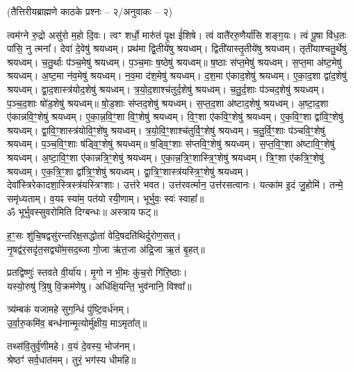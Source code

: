 \centerline{\scriptsize (तैत्तिरीयब्राह्मणे काठके प्रश्नः – २/अनुवाकः – २)}
त्वम॑ग्ने रु॒द्रो असु॑रो म॒हो दि॒वः। त्वꣳ शर्धो॒ मारु॑तं पृ॒क्ष ई॑शिषे।
त्वं वातै॑ररु॒णैर्या॑सि शङ्ग॒यः। त्वं पू॒षा वि॑ध॒तः पा॑सि॒ नु त्मना᳚।
देवा॑ दे॒वेषु॑ श्रयध्वम्। प्रथ॑मा द्वि॒तीये॑षु श्रयध्वम्।
द्विती॑यास्तृ॒तीये॑षु श्रयध्वम्। तृती॑याश्चतु॒र्थेषु॑ श्रयध्वम्।
च॒तु॒र्थाः प॑ञ्च॒मेषु॑ श्रयध्वम्। प॒ञ्च॒माः ष॒ष्ठेषु॑ श्रयध्वम्॥
ष॒ष्ठाः स॑प्त॒मेषु॑ श्रयध्वम्। स॒प्त॒मा अ॑ष्ट॒मेषु॑ श्रयध्वम्।
अ॒ष्ट॒मा न॑व॒मेषु॑ श्रयध्वम्। न॒व॒मा द॑श॒मेषु॑ श्रयध्वम्।
द॒श॒मा ए॑काद॒शेषु॑ श्रयध्वम्। ए॒का॒द॒शा द्वा॑द॒शेषु॑ श्रयध्वम्।
द्वा॒द॒शास्त्र॑योद॒शेषु॑ श्रयध्वम्। त्र॒यो॒द॒शाश्च॑तुर्द॒शेषु॑ श्रयध्वम्।
च॒तु॒र्द॒शाः प॑ञ्चद॒शेषु॑ श्रयध्वम्। प॒ञ्च॒द॒शाः षो॑ड॒शेषु॑ श्रयध्वम्॥
षो॒ड॒शाः स॑प्तद॒शेषु॑ श्रयध्वम्। स॒प्त॒द॒शा अ॑ष्टाद॒शेषु॑ श्रयध्वम्। अ॒ष्टा॒द॒शा ए॑कान्नवि॒ꣳ॒शेषु॑ श्रयध्वम्। ए॒का॒न्न॒वि॒ꣳ॒शा वि॒ꣳ॒शेषु॑ श्रयध्वम्। वि॒ꣳ॒शा ए॑कवि॒ꣳ॒शेषु॑ श्रयध्वम्। ए॒क॒वि॒ꣳ॒शा द्वा॑वि॒ꣳ॒शेषु॑ श्रयध्वम्। द्वा॒वि॒ꣳ॒शास्त्र॑योवि॒ꣳ॒शे॑षु श्रयध्वम्। त्र॒यो॒वि॒ꣳ॒शाश्च॑तुर्वि॒ꣳ॒शेषु॑ श्रयध्वम्। च॒तु॒र्वि॒ꣳ॒शाः प॑ञ्चवि॒ꣳ॒शेषु॑ श्रयध्वम्। प॒ञ्च॒वि॒ꣳ॒शाः ष॑ड्वि॒ꣳ॒शेषु॑ श्रयध्वम्॥
ष॒ड्वि॒ꣳ॒शाः स॑प्तवि॒ꣳ॒शेषु॑ श्रयध्वम्। स॒प्त॒वि॒ꣳ॒शा अ॑ष्टावि॒ꣳ॒शेषु॑ श्रयध्वम्।
अ॒ष्टा॒वि॒ꣳ॒शा ए॑कान्नत्रि॒ꣳ॒शेषु॑ श्रयध्वम्। ए॒का॒न्न॒त्रि॒ꣳ॒शास्त्रि॒ꣳ॒शेषु॑ श्रयध्वम्।
त्रि॒ꣳ॒शा ए॑कत्रि॒ꣳ॒शेषु॑ श्रयध्वम्। ए॒क॒त्रि॒ꣳ॒शा द्वा᳚त्रि॒ꣳ॒शेषु॑ श्रयध्वम्।
द्वा॒त्रि॒ꣳ॒शास्त्र॑यस्त्रि॒ꣳ॒शेषु॑ श्रयध्वम्। देवा᳚स्त्रिरेकादशा॒स्त्रिस्त्र॑यस्त्रिꣳशाः।
उत्त॑रे भवत। उत्त॑रवर्त्मान॒ उत्त॑रसत्वानः।
यत्का॑म इ॒दं जु॒होमि॑। तन्मे॒ समृ॑ध्यताम्।
व॒यꣴ स्या॑म॒ पत॑यो रयी॒णाम्। भूर्भुवः॒ स्वः॑ स्वाहा᳚॥\\
ॐ भूर्भुवस्सुवरोमिति दिग्बन्धः॥ अस्त्राय फट्॥


ह॒ꣳ॒सः शु॑चि॒षद्वसु॑रन्तरिक्ष॒सद्धोता॑ वेदि॒षदति॑थिर्दुरोण॒सत्।\\
नृ॒षद्व॑र॒सदृ॑त॒सद्व्यो॑म॒सद॒ब्जा गो॒जा ऋ॑त॒जा अ॑द्रि॒जा ऋ॒तं बृ॒हत्॥

प्रतद्विष्णुः॑ स्तवते वी॒र्या॑य। मृ॒गो न भी॒मः कु॑च॒रो गि॑रि॒ष्ठाः।\\
यस्यो॒रुषु॑ त्रि॒षु वि॒क्रम॑णेषु। अधि॑क्षि॒यन्ति॒ भुव॑नानि॒ विश्वा᳚॥

त्र्य॑म्बकं यजामहे सुग॒न्धिं पु॑ष्टि॒वर्ध॑नम्।\\
उ॒र्वा॒रु॒कमि॑व॒ बन्ध॑नान्मृ॒त्योर्मु॑क्षीय॒ माऽमृता᳚त्॥

तथ्स॑वि॒तुर्वृ॑णीमहे। व॒यं दे॒वस्य॒ भोज॑नम्‌।\\
श्रेष्ठꣳ॑ सर्व॒धात॑मम्‌। तुरं॒ भग॑स्य धीमहि॥

